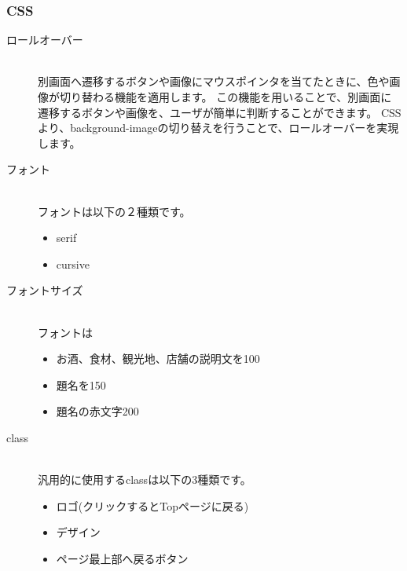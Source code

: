 \documentclass[a4j,titlepage]{jarticle}
\begin{document}
\subsubsection{CSS}
\begin{description}
\item[ロールオーバー]~\\
別画面へ遷移するボタンや画像にマウスポインタを当てたときに、色や画像が切り替わる機能を適用します。
この機能を用いることで、別画面に遷移するボタンや画像を、ユーザが簡単に判断することができます。
CSSより、background-imageの切り替えを行うことで、ロールオーバーを実現します。

\item [フォント]~\\
フォントは以下の２種類です。

\begin{itemize}
\item serif
\item cursive
\end{itemize}

\item [フォントサイズ]~\\
フォントは%

\begin{itemize}
\item お酒、食材、観光地、店舗の説明文を100%
\item 題名を150%
\item 題名の赤文字200%
\end{itemize}


\item [class]~\\
汎用的に使用するclassは以下の3種類です。

\begin{itemize}
\item ロゴ(クリックするとTopページに戻る)
\item デザイン
\item ページ最上部へ戻るボタン
\end{itemize}

\end{description}
\end{document}
